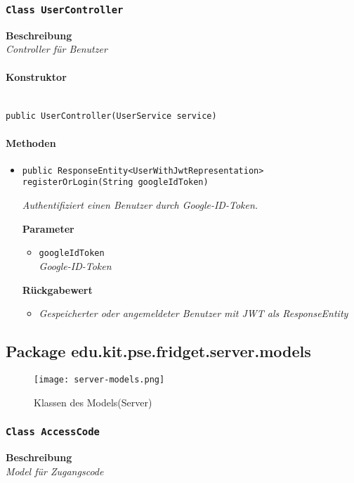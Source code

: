      \subsubsection{\texttt{Class UserController}}
     \textbf{Beschreibung} \\
     \textit{Controller für Benutzer}
     \paragraph*{Konstruktor}\mbox{} \\
     \texttt{public UserController(UserService service)}
     \paragraph*{Methoden}
     \begin{itemize}
     	\item{\texttt{public ResponseEntity<UserWithJwtRepresentation> registerOrLogin(String googleIdToken)}}
     	
     	\textit{Authentifiziert einen Benutzer durch Google-ID-Token.}
     	
     	\textbf{Parameter}
     	\begin{itemize}
     		\item\texttt{googleIdToken}\\
     		\textit{Google-ID-Token}  
     	\end{itemize}
     
     	\textbf{Rückgabewert}
     	\begin{itemize}
     		\item\textit{Gespeicherter oder angemeldeter Benutzer mit JWT als ResponseEntity}
     	\end{itemize}
     \end{itemize}
 
     \subsection{Package edu.kit.pse.fridget.server.models}
     \begin{figure}[H]
	       \centering
	       \texttt{[image: server-models.png]}
	       \caption{Klassen des Models(Server)}
	      \end{figure}
     \subsubsection{\texttt{Class AccessCode}}
     \textbf{Beschreibung} \\
     \textit{Model für Zugangscode}
